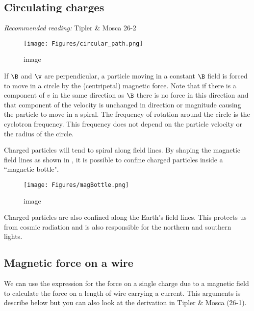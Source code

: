 \documentclass[
]{book}
\theoremstyle{definition}
\theoremstyle{definition}
\theoremstyle{definition}
\theoremstyle{definition}
\theoremstyle{remark}
\begin{document}
\hypertarget{circulating-charges}{%
\subsection{Circulating charges}\label{circulating-charges}}

\emph{Recommended reading:} Tipler \& Mosca 26-2

\begin{figure}
\centering
\texttt{[image: Figures/circular\_path.png]}
\caption{image}
\end{figure}

If \(\B\) and \(\v\) are perpendicular, a particle moving in a constant \(\B\)
field is forced to move in a circle by the (centripetal) magnetic force.
Note that if there is a component of \(v\) in the same direction as \(\B\)
there is no force in this direction and that component of the velocity
is unchanged in direction or magnitude causing the particle to move in a
spiral. The frequency of rotation around the circle is the cyclotron
frequency. This frequency does not depend on the particle velocity or
the radius of the circle.

Charged particles will tend to spiral along field lines. By shaping the
magnetic field lines as shown in , it is possible to confine charged
particles inside a ``magnetic bottle".

\begin{figure}
\centering
\texttt{[image: Figures/magBottle.png]}
\caption{image}
\end{figure}

Charged particles are also confined along the Earth's field lines. This
protects us from cosmic radiation and is also responsible for the
northern and southern lights.

\hypertarget{magnetic-force-on-a-wire}{%
\subsection{Magnetic force on a wire}\label{magnetic-force-on-a-wire}}

We can use the expression for the force on a single charge due to a
magnetic field to calculate the force on a length of wire carrying a
current. This arguments is describe below but you can also look at the
derivation in Tipler \& Mosca (26-1).
\end{document}
